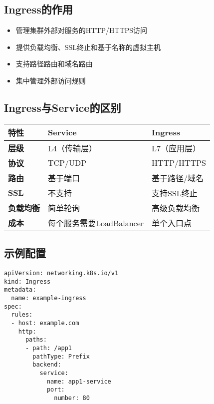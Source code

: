 \documentclass[12pt,a4paper]{article}
\begin{document}
\subsection{Ingress的作用}
\begin{itemize}
    \item 管理集群外部对服务的HTTP/HTTPS访问
    \item 提供负载均衡、SSL终止和基于名称的虚拟主机
    \item 支持路径路由和域名路由
    \item 集中管理外部访问规则
\end{itemize}

\subsection{Ingress与Service的区别}

\begin{longtable}{|p{3cm}|p{5cm}|p{5cm}|}
\hline
\textbf{特性} & \textbf{Service} & \textbf{Ingress} \\
\hline
\textbf{层级} & L4（传输层） & L7（应用层） \\
\hline
\textbf{协议} & TCP/UDP & HTTP/HTTPS \\
\hline
\textbf{路由} & 基于端口 & 基于路径/域名 \\
\hline
\textbf{SSL} & 不支持 & 支持SSL终止 \\
\hline
\textbf{负载均衡} & 简单轮询 & 高级负载均衡 \\
\hline
\textbf{成本} & 每个服务需要LoadBalancer & 单个入口点 \\
\hline
\end{longtable}

\subsection{示例配置}
\begin{lstlisting}
apiVersion: networking.k8s.io/v1
kind: Ingress
metadata:
  name: example-ingress
spec:
  rules:
  - host: example.com
    http:
      paths:
      - path: /app1
        pathType: Prefix
        backend:
          service:
            name: app1-service
            port:
              number: 80
\end{lstlisting}
\end{document}
